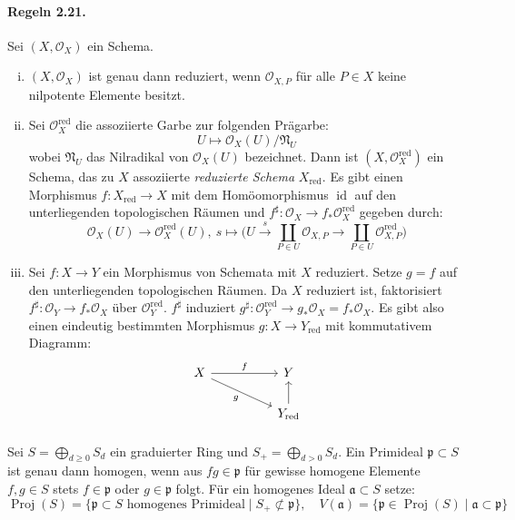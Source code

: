 \paragraph{Regeln 2.21.}\label{2.21} Sei $(X,\mathcal{O}_X)$ ein Schema.
\begin{enumerate}[(i)]
\item $(X, \mathcal{O}_X)$ ist genau dann reduziert, wenn $\mathcal{O}_{X,P}$ für alle $P\in X$ keine nilpotente Elemente besitzt.
\item Sei $\mathcal{O}_X^\text{red}$ die assoziierte Garbe zur folgenden Prägarbe:
\[ U \mapsto \mathcal{O}_X(U)/\mathfrak{N}_U \]
wobei $\mathfrak{N}_U$ das Nilradikal von $\mathcal{O}_X(U)$ bezeichnet. Dann ist $(X,\mathcal{O}_X^\text{red})$ ein Schema, das zu $X$ assoziierte \textit{reduzierte Schema} $X_\text{red}$. Es gibt einen Morphismus $f:X_\text{red}\to X$ mit dem Homöomorphismus $\operatorname{id}$ auf den unterliegenden topologischen Räumen und $f^\sharp:\mathcal{O}_X\to f_\ast\mathcal{O}_X^\text{red}$ gegeben durch:
\[\mathcal{O}_X(U)\to\mathcal{O}_X^\text{red}(U),\ s\mapsto \Big(U\stackrel{s}{\to}\coprod_{P\in U}\mathcal{O}_{X,P} \to\coprod_{P\in U}\mathcal{O}_{X,P}^\text{red}\Big) \]
\item Sei $f:X\to Y$ ein Morphismus von Schemata mit $X$ reduziert. Setze $g=f$ auf den unterliegenden topologischen Räumen. Da $X$ reduziert ist, faktorisiert $f^\sharp:\mathcal{O}_Y\to f_\ast\mathcal{O}_X$ über $\mathcal{O}_Y^\text{red}$. $f^\sharp$ induziert $g^\sharp:\mathcal{O}_Y^\text{red}\to g_\ast\mathcal{O}_X=f_\ast\mathcal{O}_X$. Es gibt also einen eindeutig bestimmten Morphismus $g:X\to Y_\text{red}$ mit kommutativem Diagramm:
\[\begin{tikzcd}
X\ar[rr, "f"]\ar[drr, "g"'] && Y\\
&& Y_\text{red}\ar[u]
\end{tikzcd} \]
\end{enumerate}

\paragraph{} Sei $S=\bigoplus_{d\geq 0} S_d$ ein graduierter Ring und $S_+=\bigoplus_{d>0}S_d$. Ein Primideal $\mathfrak{p}\subset S$ ist genau dann homogen, wenn aus $fg\in\mathfrak{p}$ für gewisse homogene Elemente $f,g\in S$ stets $f\in\mathfrak{p}$ oder $g\in\mathfrak{p}$ folgt. Für ein homogenes Ideal $\mathfrak{a}\subset S$ setze:
\[\operatorname{Proj}(S)=\{\mathfrak{p}\subset S\text{ homogenes Primideal}\mid S_+\not\subset\mathfrak{p}\},\quad V(\mathfrak{a})=\{\mathfrak{p}\in\operatorname{Proj}(S)\mid\mathfrak{a}\subset\mathfrak{p}\} \]


